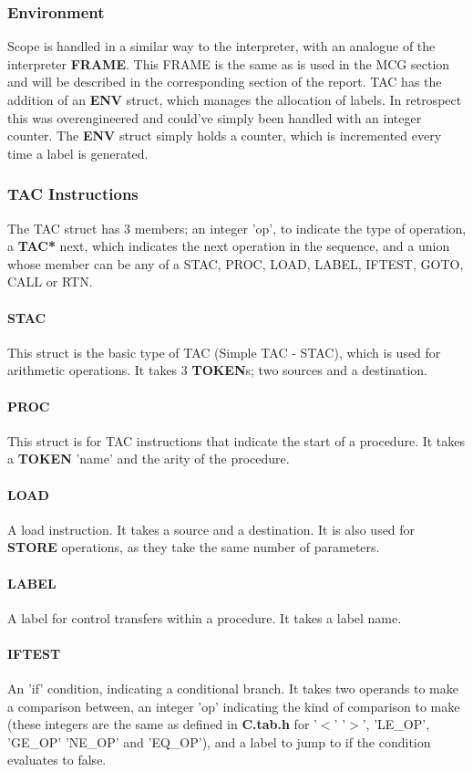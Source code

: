 \documentclass[12pt]{article}
\begin{document}
\subsubsection{Environment}
Scope is handled in a similar way to the interpreter, with an analogue of the interpreter \textbf{FRAME}. This FRAME is the same as is used in the MCG section and will be described in the corresponding section of the report. 
TAC has the addition of an \textbf{ENV} struct, which manages the allocation of labels. In retrospect this was overengineered and could've simply been handled with an integer counter.
The \textbf{ENV} struct simply holds a counter, which is incremented every time a label is generated. 
\subsubsection{TAC Instructions}
The TAC struct has 3 members; an integer 'op', to indicate the type of operation, a \textbf{TAC*} next, which indicates the next operation in the sequence, and a union whose member can be any of a
 STAC, PROC, LOAD, LABEL, IFTEST, GOTO, CALL or RTN. 
\paragraph{STAC} This struct is the basic type of TAC (Simple TAC - STAC), which is used for arithmetic operations. It takes 3 \textbf{TOKEN}s; two sources and a destination.
\paragraph{PROC} This struct is for TAC instructions that indicate the start of a procedure. It takes a \textbf{TOKEN} 'name' and the arity of the procedure. 
\paragraph{LOAD} A load instruction. It takes a source and a destination. It is also used for \textbf{STORE} operations, as they take the same number of parameters.
\paragraph{LABEL}A label for control transfers within a procedure. It takes a label name.
\paragraph{IFTEST} An 'if' condition, indicating a conditional branch. It takes two operands to make a comparison between, an integer 'op' indicating the kind of comparison to make (these integers are the same as defined in \textbf{C.tab.h} for '$<$' '$>$', 'LE\_OP', 'GE\_OP' 'NE\_OP' and 'EQ\_OP'), and a label to jump to if the condition evaluates to false. 
\end{document}
